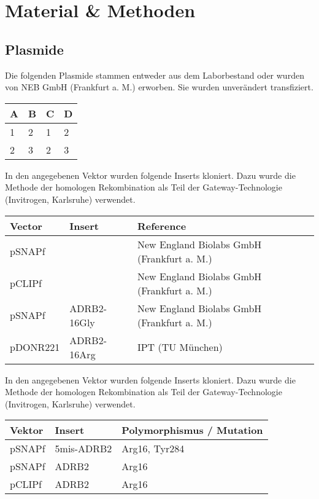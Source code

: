 \chapter{Material \& Methoden}\label{chapter:materialmethoden}

\section{Plasmide}
Die folgenden Plasmide stammen entweder aus dem Laborbestand oder wurden von NEB GmbH (Frankfurt a. M.) erworben. Sie wurden unverändert transfiziert.

\begin{table}[htsb]
  \begin{tabular}{l l l l}
    \toprule
      A & B & C & D \\
    \midrule
      1 & 2 & 1 & 2 \\
      2 & 3 & 2 & 3 \\
    \bottomrule
  \end{tabular}
\end{table}

In den angegebenen Vektor wurden folgende Inserts kloniert. Dazu wurde die Methode der homologen Rekombination als Teil der Gateway-Technologie (Invitrogen, Karlsruhe) verwendet.

\begin{table}[htsb]
    \begin{tabular}{lll}
        \toprule
        Vector		&	Insert		& 	Reference	\\
        \midrule
        pSNAPf		&				&	New England Biolabs GmbH (Frankfurt a. M.)\\
        pCLIPf		&				&	New England Biolabs GmbH (Frankfurt a. M.)\\
        pSNAPf		&	ADRB2-16Gly	&	New England Biolabs GmbH (Frankfurt a. M.)\\
        pDONR221	&	ADRB2-16Arg	    &	IPT (TU München)\\
    \bottomrule
    \end{tabular}
\end{table}

In den angegebenen Vektor wurden folgende Inserts kloniert. Dazu wurde die Methode der homologen Rekombination als Teil der Gateway-Technologie (Invitrogen, Karlsruhe) verwendet.

\begin{table}[htsb]
\begin{tabular}{lll}
\toprule
Vektor		&	Insert		&	Polymorphismus / Mutation\\
\midrule
pSNAPf		&	5mis-ADRB2	&	Arg16, Tyr284\\
pSNAPf		&	ADRB2		&	Arg16\\
pCLIPf		&	ADRB2		&	Arg16\\
\bottomrule
\end{tabular}
\end{table}

